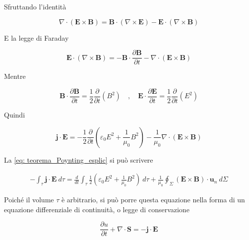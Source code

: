 Sfruttando l'identità

\begin{equation}
    \nabla \cdot (\mathbf{E} \times \mathbf{B}) = \mathbf{B} \cdot (\nabla \times \mathbf{E}) - \mathbf{E} \cdot (\nabla \times \mathbf{B})
\end{equation}

E la legge di Faraday

\begin{equation}
    \mathbf{E} \cdot (\nabla \times \mathbf{B}) = - \mathbf{B} \cdot \frac{\partial \mathbf{B}}{\partial t} - \nabla \cdot (\mathbf{E} \times \mathbf{B})
\end{equation}

Mentre 

\begin{equation}
    \mathbf{B} \cdot \frac{\partial \mathbf{B}}{\partial t} = \frac{1}{2} \frac{\partial}{\partial t} (B^2) \quad , \quad \mathbf{E} \cdot \frac{\partial \mathbf{E}}{\partial t} = \frac{1}{2} \frac{\partial}{\partial t} (E^2)
\end{equation}

Quindi 

\begin{equation} \label{eq: teorema_Poynting_esplic}
    \mathbf{j} \cdot \mathbf{E} = - \frac{1}{2} \frac{\partial}{\partial t} \left( \varepsilon_0 E^2 + \frac{1}{\mu_0} B^2 \right) - \frac{1}{\mu_0} \nabla \cdot (\mathbf{E} \times \mathbf{B})
\end{equation}

La \ref{eq: teorema_Poynting_esplic} si può scrivere 

\begin{tcolorbox}[colback=yellow!10!white, colframe=orange!70!black, boxrule=0.8pt]
\begin{align}
    - \int_{\tau} \mathbf{j} \cdot \mathbf{E} \ d\tau = \frac{d}{dt} \int_{\tau} \frac{1}{2} \left( \varepsilon_0 E^2 + \frac{1}{\mu_0} B^2 \right) \ d\tau + \frac{1}{\mu_0} \oint_{\Sigma} (\mathbf{E} \times \mathbf{B}) \cdot \mathbf{u}_n \ d\Sigma
\end{align}
\end{tcolorbox}

Poiché il volume $\tau$ è arbitrario, si può porre questa equazione nella forma di un equazione differenziale di continuità, o legge di conservazione

\begin{tcolorbox}[colback=yellow!10!white, colframe=orange!70!black, boxrule=0.8pt]
\begin{equation} \label{eq: teorema_di_Poynting}
    \frac{\partial u}{\partial t} + \nabla \cdot \mathbf{S} = - \mathbf{j} \cdot \mathbf{E}
\end{equation}
\end{tcolorbox}

